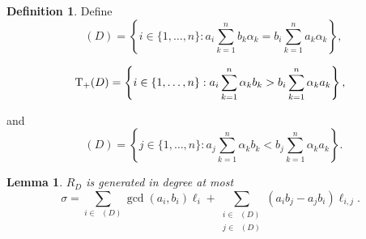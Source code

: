 \documentclass{amsart}
\theoremstyle{plain}
\newtheorem{lem}[thm]{Lemma}
\theoremstyle{definition}
\newtheorem{defn}[thm]{Definition}
\theoremstyle{remark}
\numberwithin{equation}{section}
\newcommand\bida{a}
\newcommand\bidb{b}
\DeclareMathOperator{\Te}{T_=}
\DeclareMathOperator{\Tp}{T_+}
\DeclareMathOperator{\Tm}{T_-}
\begin{document}
\begin{defn}
Define 
\begin{equation}
\label{eqn:define-T=(D)}
	\Te(D) = \left\{i \in \{1, \ldots, n\}: \bida_i \sum_{k=1}^n \bidb_k 
\alpha_k = \bidb_i \sum_{k=1}^n \bida_k \alpha_k \right\},
\end{equation}

\begin{equation}
\label{eqn:define-T+(D)}
	\Tp(D) = \left\{ i \in \{1, \ldots, n\}:  \vphantom{\sum_{k = 1}^n} 
	\bida_i \sum_{k = 1}^n \alpha_k \bidb_k > \bidb_i \sum_{k = 1}^n \alpha_k \bida_k 
\right\},
\end{equation}

\noindent
and
\begin{equation}
\label{eqn:define-T-(D)}
	\Tm(D) = \left\{ j \in \{1, \ldots, n\}: \bida_j \sum_{k = 1}^n \alpha_k
	\bidb_k < \bidb_j \sum_{k=1}^n \alpha_k \bida_k \right\}.
\end{equation}
\end{defn}

\begin{lem}
\label{lem:hirz-generators}
$R_D$ is generated in degree at most
\[
	\sigma = \sum_{i \in \Te(D)} \gcd(\bida_i, \bidb_i) \ell_i + \sum_{\substack
	{i \in \Tp(D) \\ j\in \Tm(D)}} (\bida_i \bidb_j - \bida_j \bidb_i)
	\ell	_{i,j}.
\]
\end{lem}
\end{document}
